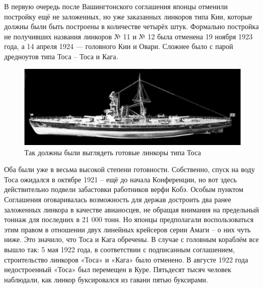 В первую очередь после Вашингтонского соглашения японцы отменили постройку ещё не заложенных, но уже заказанных линкоров типа Кии, которые должны были быть построены в количестве четырёх штук. Формально постройка не получивших названия линкоров № 11 и № 12 была отменена 19 ноября 1923 года, а 14 апреля 1924 — головного Кии и Овари. Сложнее было с парой дредноутов типа Тоса – Тоса и Кага. 

\begin{figure}[h!tb] 
	\centering\includegraphics[scale=0.3]{Glava7/MIoBH1FflI8.jpg}
	\caption{Так должны были выглядеть готовые линкоры типа Тоса}%
\end{figure}

Оба были уже в весьма высокой степени готовности. Собственно, спуск на воду Тоса ожидался в октябре 1921 – ещё до начала Конференции, но вот здесь действительно подвели забастовки работников верфи Кобэ. Особым пунктом Соглашения оговаривалась возможность для держав достроить два ранее заложенных линкора в качестве авианосцев, не обращая внимания на предельный тоннаж для последних в 21 000 тонн. Но японцы предполагали воспользоваться этим правом в отношении двух линейных крейсеров серии Амаги – о них чуть ниже. Это значило, что Тоса и Кага обречены. В случае с головным кораблём все вышло так: 5 мая 1922 года, в соответствии с подписанным соглашением, строительство линкоров «Тоса» и «Кага» было отменено. В августе 1922 года недостроенный «Тоса» был перемещен в Куре. Пятьдесят тысяч человек наблюдали, как линкор буксировался из гавани пятью буксирами. 

